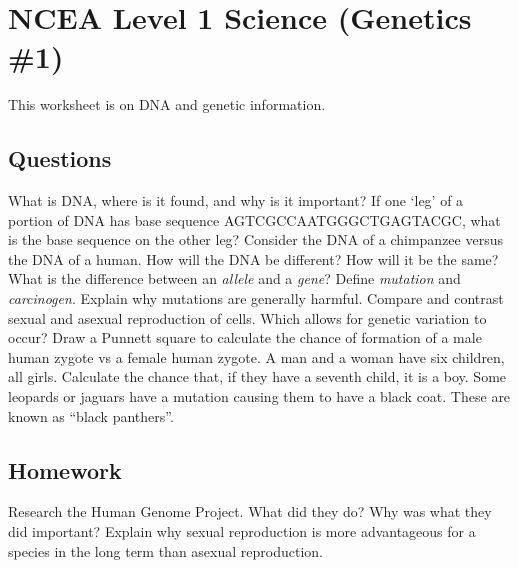 \documentclass{exam}
\begin{document}
\section*{NCEA Level 1 Science (Genetics \#1)}

This worksheet is on DNA and genetic information.

\subsection*{Questions}
\begin{questions}
  \question What is DNA, where is it found, and why is it important?
  \question If one `leg' of a portion of DNA has base sequence AGTCGCCAATGGGCTGAGTACGC, what is the base sequence on the other leg?
  \question Consider the DNA of a chimpanzee versus the DNA of a human. How will the DNA be different? How will it be the same?
  \question What is the difference between an \textit{allele} and a \textit{gene}?
  \question Define \textit{mutation} and \textit{carcinogen}. Explain why mutations are generally harmful.
  \question Compare and contrast sexual and asexual reproduction of cells. Which allows for genetic variation to occur?
  \question Draw a Punnett square to calculate the chance of formation of a male human zygote vs a female human zygote.
  \question A man and a woman have six children, all girls. Calculate the chance that, if they have a seventh child, it is a boy.
  \question {[NZQA 2017]} Some leopards or jaguars have a mutation causing them to have a black coat. These are known as ``black panthers''.
\end{questions}

\subsection*{Homework}
\begin{questions}
  \question Research the Human Genome Project. What did they do? Why was what they did important?
  \question Explain why sexual reproduction is more advantageous for a species in the long term than asexual reproduction.
\end{questions}
\end{document}
